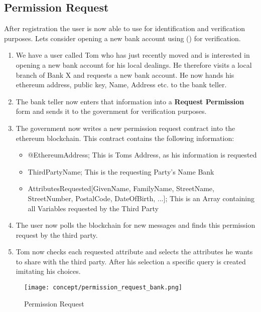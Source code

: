\subsection{Permission Request}
After registration the user is now able to use \projectName{} for identification and verification purposes. Lets consider opening a new bank account using \projectName() for verification.



\begin{enumerate}
\item \label{permission_request_item_one}
We have a user called Tom who has just recently moved and is interested in opening a new bank account for his local dealings. He therefore visits a local branch of Bank X and requests a new bank account. He now hands his ethereum address, public key, Name, Address etc. to the bank teller.
\item \label{permission_request_item_two}
The bank teller now enters that information into a \textbf{Request Permission} form and sends it to the government for verification purposes.
\item \label{permission_request_item_three}
The government now writes a new permission request contract into the ethereum blockchain. This contract contains the following information:
\begin{itemize}
\item @EthereumAddress; This is Toms Address, as his information is requested
\item ThirdPartyName; This is the requesting Party's Name Bank 
\item AttributesRequested[GivenName, FamilyName, StreetName, StreetNumber, PostalCode, DateOfBirth, ...]; This is an Array containing all Variables requested by the Third Party
\end{itemize}
\item \label{permission_request_item_four}
The user now polls the blockchain for new messages and finds this permission request by the third party.
\item \label{permission_request_item_five}
Tom now checks each requested attribute and selects the attributes he wants to share with the third party. After his selection a specific query is created imitating his choices.
\end{enumerate}

\begin{figure}[ht]
\centering
\texttt{[image: concept/permission\_request\_bank.png]}
\caption{Permission Request}
\label{fig:permission_request}
\end{figure}

